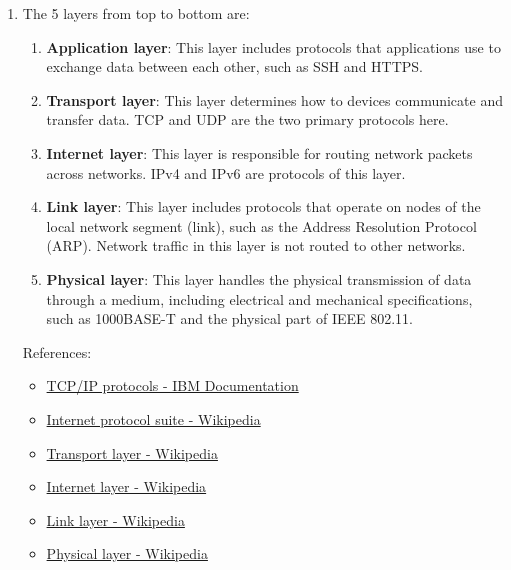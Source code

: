 \documentclass[12pt, a4paper]{article}
\begin{document}
\begin{enumerate}
    \item The 5 layers from top to bottom are:
    \begin{enumerate}
      \item \textbf{Application layer}: This layer includes protocols that
        applications use to exchange data between each other, such as SSH
        and HTTPS.
      \item \textbf{Transport layer}: This layer determines how to devices
        communicate and transfer data. TCP and UDP are the two primary protocols
        here.
      \item \textbf{Internet layer}: This layer is responsible for routing
        network packets across networks. IPv4 and IPv6 are protocols of this
        layer.
      \item \textbf{Link layer}: This layer includes protocols that operate
        on nodes of the local network segment (link), such as the Address
        Resolution Protocol (ARP). Network traffic in this layer is not
        routed to other networks.
      \item \textbf{Physical layer}: This layer handles the physical
        transmission of data through a medium, including electrical and
        mechanical specifications, such as 1000BASE-T and the physical part of
        IEEE 802.11.
    \end{enumerate}
    References:
    \begin{itemize}
      \item \href{https://www.ibm.com/docs/en/aix/7.3?topic=protocol-tcpip-protocols}{TCP/IP protocols - IBM Documentation}
      \item \href{https://en.wikipedia.org/wiki/Internet_protocol_suite}{Internet protocol suite - Wikipedia}
      \item \href{https://en.wikipedia.org/wiki/Transport_layer}{Transport layer - Wikipedia}
      \item \href{https://en.wikipedia.org/wiki/Internet_layer}{Internet layer - Wikipedia}
      \item \href{https://en.wikipedia.org/wiki/Link_layer}{Link layer - Wikipedia}
      \item \href{https://en.wikipedia.org/wiki/Physical_layer}{Physical layer - Wikipedia}
    \end{itemize}


\end{enumerate}
\end{document}
